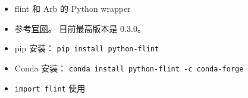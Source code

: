 
\begin{issues}
\issueDraft
\end{issues}

\begin{itemize}
\item flint 和 Arb 的 Python wrapper
\item 参考\href{https://fredrikj.net/python-flint/}{官网}。 目前最高版本是 0.3.0。
\item pip 安装： \verb|pip install python-flint|
\item Conda 安装： \verb|conda install python-flint -c conda-forge|
\item \verb|import flint| 使用
\end{itemize}

